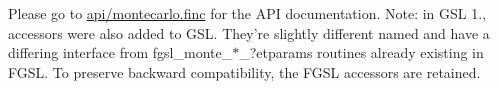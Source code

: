 Please go to \hyperlink{montecarlo_8finc}{api/montecarlo.\-finc} for the A\-P\-I documentation. Note\-: in G\-S\-L 1., accessors were also added to G\-S\-L. They're slightly different named and have a differing interface from fgsl\-\_\-monte\-\_\-$\ast$\-\_\-?etparams routines already existing in F\-G\-S\-L. To preserve backward compatibility, the F\-G\-S\-L accessors are retained. 